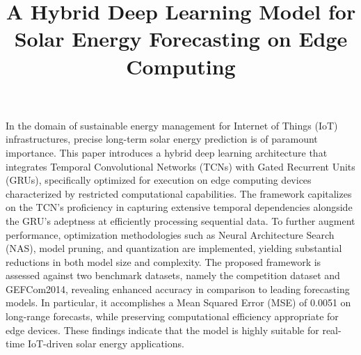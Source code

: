 \documentclass[sn-mathphys-num]{sn-jnl}%
\begin{document}
\title[Article Title]{A Hybrid Deep Learning Model for Solar Energy Forecasting on Edge Computing}


\author*[1,2]{ }

\author[2,3]{ }

\author[1,2]{ }





\abstract
{
\indent In the domain of sustainable energy management for Internet of Things (IoT) infrastructures, precise long-term solar energy prediction is of paramount importance. This paper introduces a hybrid deep learning architecture that integrates Temporal Convolutional Networks (TCNs) with Gated Recurrent Units (GRUs), specifically optimized for execution on edge computing devices characterized by restricted computational capabilities. The framework capitalizes on the TCN's proficiency in capturing extensive temporal dependencies alongside the GRU's adeptness at efficiently processing sequential data. To further augment performance, optimization methodologies such as Neural Architecture Search (NAS), model pruning, and quantization are implemented, yielding substantial reductions in both model size and complexity. The proposed framework is assessed against two benchmark datasets, namely the competition dataset and GEFCom2014, revealing enhanced accuracy in comparison to leading forecasting models. In particular, it accomplishes a Mean Squared Error (MSE) of 0.0051 on long-range forecasts, while preserving computational efficiency appropriate for edge devices. These findings indicate that the model is highly suitable for real-time IoT-driven solar energy applications.
}
\end{document}
